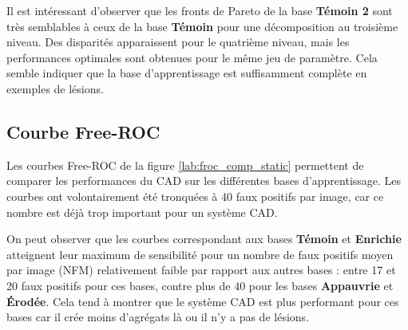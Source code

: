 Il est intéressant d'observer que les fronts de Pareto de la base \textbf{Témoin 2} sont très semblables à ceux de la base \textbf{Témoin} pour une décomposition au troisième niveau. Des disparités apparaissent pour le quatrième niveau, mais les performances optimales sont obtenues pour le même jeu de paramètre. Cela semble indiquer que la base d’apprentissage est suffisamment complète en exemples de lésions.
\begin{table}[h!]
\centering
{}
\caption[Paramètres $(C,\gamma, j)$ sélectionnés pour l'optimisation des performances sur les différentes bases]{Paramètres $(C,\gamma, j)$ sélectionnés pour l'optimisation des performances sur les différentes bases. Sont indiqués pour chaque base le triplet de paramètres sélectionnés ainsi que sa position sur le front de Pareto.}
\label{fig:paramsParams}
\end{table}

\FloatBarrier

\subsection{Courbe Free-ROC}

Les courbes Free-ROC de la figure \ref{lab:froc_comp_static} permettent de comparer les performances du CAD sur les différentes bases d'apprentissage. Les courbes ont volontairement été tronquées à 40 faux positifs par image, car ce nombre est déjà trop important pour un système CAD.

On peut observer que les courbes correspondant aux bases \textbf{Témoin} et \textbf{Enrichie} atteignent leur maximum de sensibilité pour un nombre de faux positifs moyen par image (NFM) relativement faible par rapport aux autres bases : entre 17 et 20 faux positifs pour ces bases, contre plus de 40 pour les bases \textbf{Appauvrie} et \textbf{Érodée}. Cela tend à montrer que le système CAD est plus performant pour ces bases car il crée moins d'agrégats là ou il n'y a pas de lésions.

